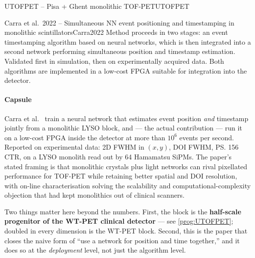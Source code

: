 \begin{programnote}{UTOFPET -- Pisa + Ghent monolithic TOF-PET}{UTOFPET}
\begin{papernote}{Carra et al.\ 2022 -- Simultaneous NN event positioning and timestamping in monolithic scintillators}{Carra2022}
Method proceeds in two stages: an event timestamping algorithm based on neural
networks, which is then integrated into a second network performing simultaneous
position and timestamp estimation. Validated first in simulation, then on
experimentally acquired data. Both algorithms are implemented in a low-cost FPGA
suitable for integration into the detector.


\paragraph{Capsule}
Carra et al.\ \cite{Carra2022} train a neural network that estimates event position
\emph{and} timestamp jointly from a monolithic LYSO block, and --- the actual
contribution --- run it on a low-cost FPGA inside the detector at more than
$10^{6}$ events per second. Reported on experimental data:
 2D FWHM in $(x,y)$,  DOI FWHM, \ps{156} CTR, on a
 LYSO monolith read out by 64
 Hamamatsu SiPMs. The paper's stated framing is
that monolithic crystals plus light networks can rival pixellated performance for
TOF-PET while retaining better spatial and DOI resolution, with on-line
characterisation solving the scalability and computational-complexity objection
that had kept monolithics out of clinical scanners.

Two things matter here beyond the numbers. First, the block is the
\textbf{half-scale progenitor of the WT-PET clinical detector} --- see
\ref{prog:UTOFPET};  doubled in every
dimension is the  WT-PET block. Second,
this is the paper that closes the naive form of ``use a network for position and
time together,'' and it does so at the \emph{deployment} level, not just the
algorithm level.


\end{papernote}
\end{programnote}
